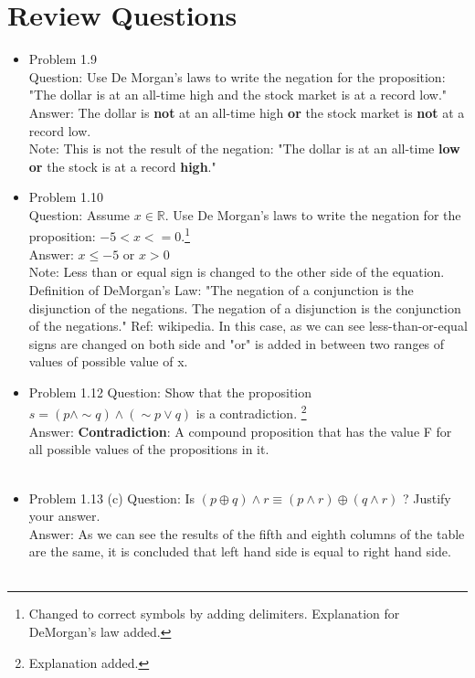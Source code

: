 \documentclass[11pt]{article}
\begin{document}
\section*{Review Questions}
\begin{itemize}

\item
Problem 1.9 \\
Question: Use De Morgan's laws to write the negation for the proposition: "The dollar is at an all-time high and the stock market is at a record low."\\
Answer: The dollar is \textbf{not} at an all-time high \textbf{or} the stock market is \textbf{not} at a record low.\\
Note: This is not the result of the negation: "The dollar is at an all-time \textbf{low} \textbf{or} the stock is at a record \textbf{high}."

\noindent{ \color{red} \rule{\linewidth} {0.5mm} }

\item
Problem 1.10 \\
Question: Assume $x \in \mathbb{R}$. Use De Morgan's laws to write the negation for the proposition: $-5 < x <= 0$.\footnote{Changed to correct symbols by adding delimiters. Explanation for DeMorgan's law added.} \\
Answer:  $x \leq -5$ or $x > 0$ \\
Note: Less than or equal sign is changed to the other side of the equation. Definition of DeMorgan's Law: "The negation of a conjunction is the disjunction of the negations. The negation of a disjunction is the conjunction of the negations." Ref: wikipedia. In this case, as we can see less-than-or-equal signs are changed on both side and "or" is added in between two ranges of values of possible value of x. 

\noindent{ \color{red} \rule{\linewidth} {0.5mm} }
\clearpage

\item
Problem 1.12
Question: Show that the proposition $s = (p \land \sim q) \land (\sim p \lor q)$ is a contradiction. \footnote{Explanation added.} \\
Answer: \textbf{Contradiction}: A compound proposition that has the value F for all possible values of the propositions in it. \\
 \\
\noindent{ \color{red} \rule{\linewidth} {0.5mm} }
\clearpage


\item
Problem 1.13 (c)
Question: Is $(p \oplus q) \land r \equiv (p \land r) \oplus (q \land r)$ ? Justify your answer. \\
Answer:  As we can see the results of the fifth and eighth columns of the table are the same, it is concluded that left hand side is equal to right hand side. \\
 \\
\noindent{ \color{red} \rule{\linewidth} {0.5mm} }
\clearpage


\end{itemize}
\end{document}
